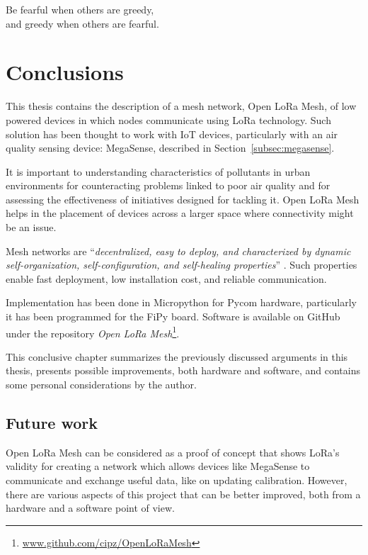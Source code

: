
\begin{savequote}[70mm]
	Be fearful when others are greedy,\\
	and greedy when others are fearful.
\end{savequote}

\chapter{Conclusions}\label{chapter:conclusions}

	This thesis contains the description of a mesh network, Open LoRa Mesh, of low powered devices in which nodes communicate using LoRa technology.
	Such solution has been thought to work with IoT devices, particularly with an air quality sensing device: MegaSense, described in Section~\ref{subsec:megasense}.
	
	It is important to understanding characteristics of pollutants in urban environments for counteracting problems linked to poor air quality and for assessing the effectiveness of initiatives designed for tackling it.
	Open LoRa Mesh helps in the placement of devices across a larger space where connectivity might be an issue.
	
	Mesh networks are ``\textit{decentralized, easy to deploy, and characterized by dynamic self-organization, self-configuration, and self-healing properties}'' \cite{Sampaio-2015}.
	Such properties enable fast deployment, low installation cost, and reliable communication.
		
	Implementation has been done in Micropython for Pycom hardware, particularly it has been programmed for the FiPy board.
	Software is available on GitHub under the repository \textit{Open LoRa Mesh}\footnote{ \url{www.github.com/cipz/OpenLoRaMesh}}.
	
	This conclusive chapter summarizes the previously discussed arguments in this thesis, presents possible improvements, both hardware and software, and contains some personal considerations by the author.

	\section{Future work}
		
		Open LoRa Mesh can be considered as a proof of concept that shows LoRa's validity for creating a network which allows devices like MegaSense to communicate and exchange useful data, like on updating calibration.
		However, there are various aspects of this project that can be better improved, both from a hardware and a software point of view.
	
